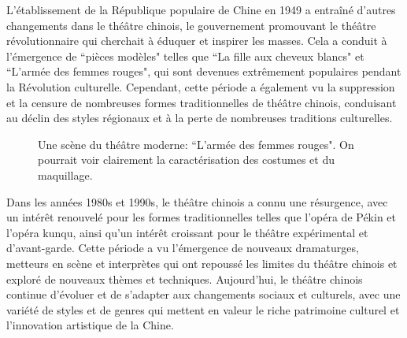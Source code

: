 \documentclass[UTF8,a4paper,12pt]{ctexart}
\numberwithin{equation}{section}
\begin{document}
L'établissement de la République populaire de Chine en 1949 a entraîné d'autres changements dans le théâtre chinois, le gouvernement promouvant le théâtre révolutionnaire qui cherchait à éduquer et inspirer les masses. Cela a conduit à l'émergence de ``pièces modèles" telles que ``La fille aux cheveux blancs" et ``L'armée des femmes rouges", qui sont devenues extrêmement populaires pendant la Révolution culturelle. Cependant, cette période a également vu la suppression et la censure de nombreuses formes traditionnelles de théâtre chinois, conduisant au déclin des styles régionaux et à la perte de nombreuses traditions culturelles.

\begin{figure}[H] 
\captionsetup{justification=centering, singlelinecheck=false}
\caption{Une scène du théâtre moderne: ``L'armée des femmes rouges". On pourrait voir clairement la caractérisation des costumes et du maquillage.}
\end{figure}

Dans les années 1980s et 1990s, le théâtre chinois a connu une résurgence, avec un intérêt renouvelé pour les formes traditionnelles telles que l'opéra de Pékin et l'opéra kunqu, ainsi qu'un intérêt croissant pour le théâtre expérimental et d'avant-garde. Cette période a vu l'émergence de nouveaux dramaturges, metteurs en scène et interprètes qui ont repoussé les limites du théâtre chinois et exploré de nouveaux thèmes et techniques. Aujourd'hui, le théâtre chinois continue d'évoluer et de s'adapter aux changements sociaux et culturels, avec une variété de styles et de genres qui mettent en valeur le riche patrimoine culturel et l'innovation artistique de la Chine.
\end{document}
